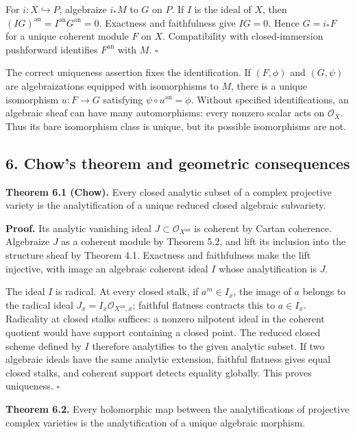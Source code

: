 \documentclass[11pt]{article}
\begin{document}
For \(i:X\hookrightarrow P\), algebraize \(i_*M\) to \(G\) on \(P\). If
\(I\) is the ideal of \(X\), then
\((IG)^{\mathrm{an}}=I^{\mathrm{an}}G^{\mathrm{an}}=0\). Exactness and
faithfulness give \(IG=0\). Hence \(G=i_*F\) for a unique coherent
module \(F\) on \(X\). Compatibility with closed-immersion pushforward
identifies \(F^{\mathrm{an}}\) with \(M\). \(\square\)

The correct uniqueness assertion fixes the identification. If
\((F,\phi)\) and \((G,\psi)\) are algebraizations equipped with
isomorphisms to \(M\), there is a unique isomorphism \(u:F\to G\)
satisfying \(\psi\circ u^{\mathrm{an}}=\phi\). Without specified
identifications, an algebraic sheaf can have many automorphisms: every
nonzero scalar acts on \(\mathcal O_X\). Thus its bare isomorphism class
is unique, but its possible isomorphisms are not.

\subsection{6. Chow's theorem and geometric
consequences}\label{chows-theorem-and-geometric-consequences}

\textbf{Theorem 6.1 (Chow).} Every closed analytic subset of a complex
projective variety is the analytification of a unique reduced closed
algebraic subvariety.

\textbf{Proof.} Its analytic vanishing ideal
\(J\subset\mathcal O_{X^{\mathrm{an}}}\) is coherent by Cartan
coherence. Algebraize \(J\) as a coherent module by Theorem 5.2, and
lift its inclusion into the structure sheaf by Theorem 4.1. Exactness
and faithfulness make the lift injective, with image an algebraic
coherent ideal \(I\) whose analytification is \(J\).

The ideal \(I\) is radical. At every closed stalk, if \(a^m\in I_x\),
the image of \(a\) belongs to the radical ideal
\(J_x=I_x\mathcal O_{X^{\mathrm{an}},x}\); faithful flatness contracts
this to \(a\in I_x\). Radicality at closed stalks suffices: a nonzero
nilpotent ideal in the coherent quotient would have support containing a
closed point. The reduced closed scheme defined by \(I\) therefore
analytifies to the given analytic subset. If two algebraic ideals have
the same analytic extension, faithful flatness gives equal closed
stalks, and coherent support detects equality globally. This proves
uniqueness. \(\square\)

\textbf{Theorem 6.2.} Every holomorphic map between the analytifications
of projective complex varieties is the analytification of a unique
algebraic morphism.
\end{document}
